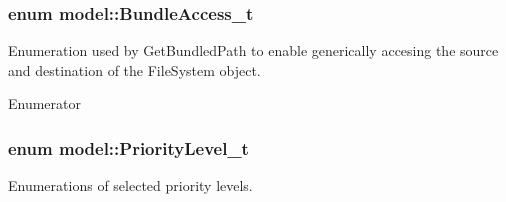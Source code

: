 \subsubsection[{\texorpdfstring{Bundle\+Access\+\_\+t}{BundleAccess_t}}]{\setlength{\rightskip}{0pt plus 5cm}enum {\bf model\+::\+Bundle\+Access\+\_\+t}\hspace{0.3cm}{\ttfamily [strong]}}\hypertarget{namespacemodel_a026dbfd7d63730bfdbca3403cd1d5d1d}{}\label{namespacemodel_a026dbfd7d63730bfdbca3403cd1d5d1d}
Enumeration used by Get\+Bundled\+Path to enable generically accesing the source and destination of the File\+System object. \begin{Desc}
\item[Enumerator]\par
\begin{description}
\item[{\em 
Source\hypertarget{namespacemodel_a026dbfd7d63730bfdbca3403cd1d5d1daf31bbdd1b3e85bccd652680e16935819}{}\label{namespacemodel_a026dbfd7d63730bfdbca3403cd1d5d1daf31bbdd1b3e85bccd652680e16935819}
}]\item[{\em 
Dest\hypertarget{namespacemodel_a026dbfd7d63730bfdbca3403cd1d5d1daec00f7b1459702b9f123453b74e2db61}{}\label{namespacemodel_a026dbfd7d63730bfdbca3403cd1d5d1daec00f7b1459702b9f123453b74e2db61}
}]\end{description}
\end{Desc}
\subsubsection[{\texorpdfstring{Priority\+Level\+\_\+t}{PriorityLevel_t}}]{\setlength{\rightskip}{0pt plus 5cm}enum {\bf model\+::\+Priority\+Level\+\_\+t}}\hypertarget{namespacemodel_a395707b640635437db2bb14563e1c41c}{}\label{namespacemodel_a395707b640635437db2bb14563e1c41c}
Enumerations of selected priority levels.

